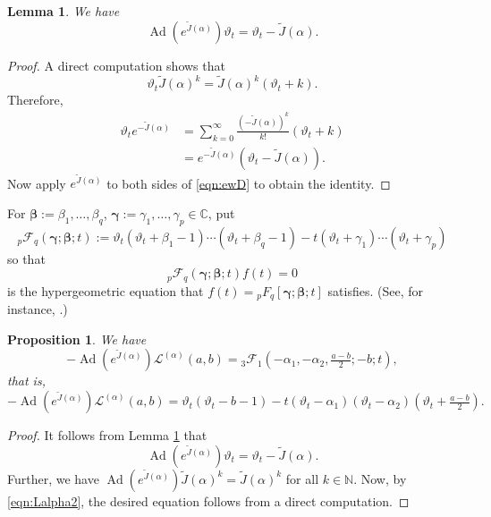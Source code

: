 \documentclass[a4paper,11pt,reqno]{amsart}
\newcommand{\CC}{\mathbb{C}}
\newcommand{\calF}{\mathcal{F}}
\newcommand{\calL}{\mathcal{L}}
\newcommand{\0}{{\bf 0}}
\newcommand{\N}{\mathbb{N}}
\newcommand{\1}{{\bf 1}}
\DeclareMathOperator{\Ad}{Ad}
\newcommand{\wJ}{\widetilde{J}}
\theoremstyle{plain}
\newtheorem{proposition}[equation]{Proposition}
\newtheorem{lemma}[equation]{Lemma}
\theoremstyle{definition}
\numberwithin{equation}{section}
\theoremstyle{definition}
\begin{document}
\begin{lemma}\label{lem:eD}
We have 
\begin{equation*}
\Ad(e^{\wJ(\alpha)})\vartheta_t 
=\vartheta_t-\wJ(\alpha).
\end{equation*}
\end{lemma}

\begin{proof}
A direct computation shows that
\begin{equation*}
\vartheta_t \wJ(\alpha)^k = \wJ(\alpha)^k(\vartheta_t + k).
\end{equation*}
Therefore,
\begin{align}
\vartheta_t e^{-\wJ(\alpha)} &= \sum_{k=0}^\infty \frac{(-\wJ(\alpha))^k}{k!} (\vartheta_t + k) \nonumber \\[3pt]
&= e^{-\wJ(\alpha)}(\vartheta_t -\wJ(\alpha)). \label{eqn:ewD}
\end{align}
Now apply $e^{\wJ(\alpha)}$ to both
sides of \eqref{eqn:ewD} to obtain the identity.
\end{proof}

For $\pmb{\beta}:=\beta_1,\ldots, \beta_q$, 
$\pmb{\gamma}:=\gamma_1,\ldots, \gamma_p \in \CC$,
put
\begin{equation*}
{}_p\calF_q(\pmb{\gamma};\pmb{\beta};t):=
\vartheta_t(\vartheta_t+\beta_{1}-1)\cdots(\vartheta_t+\beta_{q}-1)-
t(\vartheta_t+\gamma_{1})%
\cdots(\vartheta_t+\gamma_{p})
\end{equation*}
so that 
\begin{equation*}
{}_p\calF_q(\pmb{\gamma};\pmb{\beta};t) f(t) =0
\end{equation*}
is the hypergeometric equation that $f(t) = {}_pF_q[\pmb{\gamma};\pmb{\beta};t]$
satisfies. (See, for instance, \cite[(16.8.3)]{DLMF}.)

\begin{proposition}\label{prop:AdL}
We have
\begin{equation*}
-\Ad(e^{\wJ(\alpha)})\calL^{(\alpha)}(a,b)
={}_3\calF_1(-\alpha_1,-\alpha_2,\tfrac{a-b}{2};-b;t),
\end{equation*}
that is,
\begin{equation*}
-\Ad(e^{\wJ(\alpha)})\calL^{(\alpha)}(a,b)
=
\vartheta_t(\vartheta_t-b-1)
-t(\vartheta_t-\alpha_1)(\vartheta_t-\alpha_2)(\vartheta_t+\tfrac{a-b}{2}).
\end{equation*}
\end{proposition}

\begin{proof}
It follows from Lemma \ref{lem:eD} that 
\begin{equation*}
\Ad(e^{\wJ(\alpha)})\vartheta_t = \vartheta_t - \wJ(\alpha).
\end{equation*}
Further, we have $\Ad(e^{\wJ(\alpha)})\wJ(\alpha)^k=\wJ(\alpha)^k$ for all $k \in \N$.
Now, by \eqref{eqn:Lalpha2}, the desired equation follows from a direct computation.
\end{proof}
\end{document}
